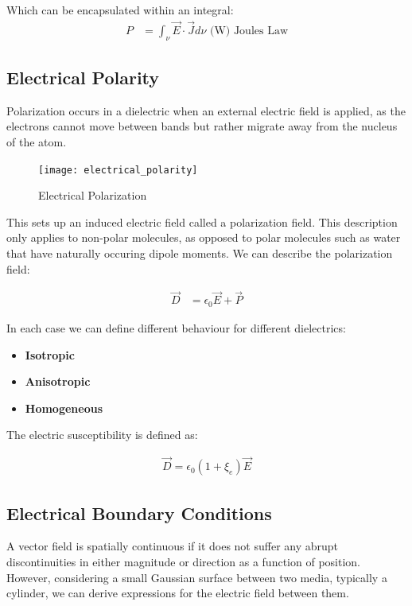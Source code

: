 \documentclass{book}
\begin{document}
Which can be encapsulated within an integral:
\begin{align*}
	P &= \int_{\nu} \vec{E} \cdot \vec{J} d \nu \text{ (W)   Joules Law}
\end{align*}

\subsection{Electrical Polarity}

Polarization occurs in a dielectric when an external electric field is applied, as the electrons cannot move between bands but rather migrate away from the nucleus of the atom. 

\begin{figure}[h]
	\centering
	\texttt{[image: electrical\_polarity]}
	\caption{Electrical Polarization}
	\label{fig:electricalpolarity}
\end{figure}
This sets up an induced electric field called a polarization field. This description only applies to non-polar molecules, as opposed to polar molecules such as water that have naturally occuring dipole moments. We can describe the polarization field:

\begin{align*}
	\vec{D} &= \epsilon_0 \vec{E} + \vec{P}
\end{align*}

In each case we can define different behaviour for different dielectrics:
\begin{itemize}
	\item \textbf{Isotropic}
	\item \textbf{Anisotropic}
	\item \textbf{Homogeneous}
\end{itemize}

The electric susceptibility is defined as:

\begin{align*}
	\vec{D} = \epsilon_0(1+\xi_e) \vec{E} 
\end{align*}
\subsection{Electrical Boundary Conditions}

A vector field is spatially continuous if it does not suffer any abrupt discontinuities in either magnitude or direction as a function of position. However, considering a small Gaussian surface between two media, typically a cylinder, we can derive expressions for the electric field between them.
\end{document}
